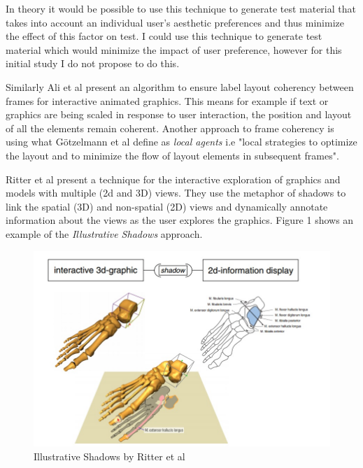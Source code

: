 \documentclass{article}
\begin{document}
In theory it would be possible to use this technique to generate test material that takes into account an individual user's aesthetic preferences and thus minimize the effect of this factor on test. I could use this technique to generate test material which would minimize the impact of user preference, however for this initial study I do not propose to do this.

Similarly Ali et al\cite{ali2005label} present an algorithm to ensure label layout coherency between frames for interactive animated graphics. This means for example if text or graphics are being scaled in response to user interaction, the position and layout of all the elements remain coherent. Another approach to frame coherency is using what Götzelmann et al define as \textit{local agents} i.e "local strategies to optimize the layout and to minimize the flow of layout elements in subsequent frames"\cite{Gotzelmann2006}. 

Ritter et al \cite{Ritter:2003:ISI:604045.604072} present a technique for the interactive exploration of graphics and models with multiple (2d and 3D) views. They use the metaphor of shadows to link the spatial (3D) and non-spatial (2D) views and dynamically annotate information about the views as the user explores the graphics. Figure 1 shows an example of the \textit{Illustrative Shadows} approach. 
\begin{center}
	\begin{figure}[!ht]
    \vspace{1cm}
		\includegraphics[width=\textwidth]{Images/illustrativeShadows.jpg}
    	\caption{Illustrative Shadows by Ritter et al \cite{Ritter:2003:ISI:604045.604072}}
        \vspace{1cm}
    \end{figure}
\end{center}
\end{document}

